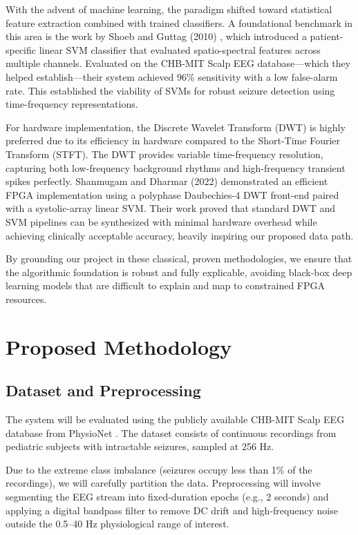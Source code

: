 \documentclass[10pt,twocolumn,letterpaper]{article}
\begin{document}
With the advent of machine learning, the paradigm shifted toward statistical feature extraction combined with trained classifiers. A foundational benchmark in this area is the work by Shoeb and Guttag (2010) \cite{shoeb2010}, which introduced a patient-specific linear SVM classifier that evaluated spatio-spectral features across multiple channels. Evaluated on the CHB-MIT Scalp EEG database---which they helped establish---their system achieved 96\% sensitivity with a low false-alarm rate. This established the viability of SVMs for robust seizure detection using time-frequency representations.

For hardware implementation, the Discrete Wavelet Transform (DWT) is highly preferred due to its efficiency in hardware compared to the Short-Time Fourier Transform (STFT). The DWT provides variable time-frequency resolution, capturing both low-frequency background rhythms and high-frequency transient spikes perfectly. Shanmugam and Dharmar (2022) \cite{shanmugam2022} demonstrated an efficient FPGA implementation using a polyphase Daubechies-4 DWT front-end paired with a systolic-array linear SVM. Their work proved that standard DWT and SVM pipelines can be synthesized with minimal hardware overhead while achieving clinically acceptable accuracy, heavily inspiring our proposed data path.

By grounding our project in these classical, proven methodologies, we ensure that the algorithmic foundation is robust and fully explicable, avoiding black-box deep learning models that are difficult to explain and map to constrained FPGA resources.

\section{Proposed Methodology}

\subsection{Dataset and Preprocessing}
The system will be evaluated using the publicly available CHB-MIT Scalp EEG database from PhysioNet \cite{chbmit}. The dataset consists of continuous recordings from pediatric subjects with intractable seizures, sampled at 256 Hz. 

Due to the extreme class imbalance (seizures occupy less than 1\% of the recordings), we will carefully partition the data. Preprocessing will involve segmenting the EEG stream into fixed-duration epochs (e.g., 2 seconds) and applying a digital bandpass filter to remove DC drift and high-frequency noise outside the 0.5--40 Hz physiological range of interest.
\end{document}
